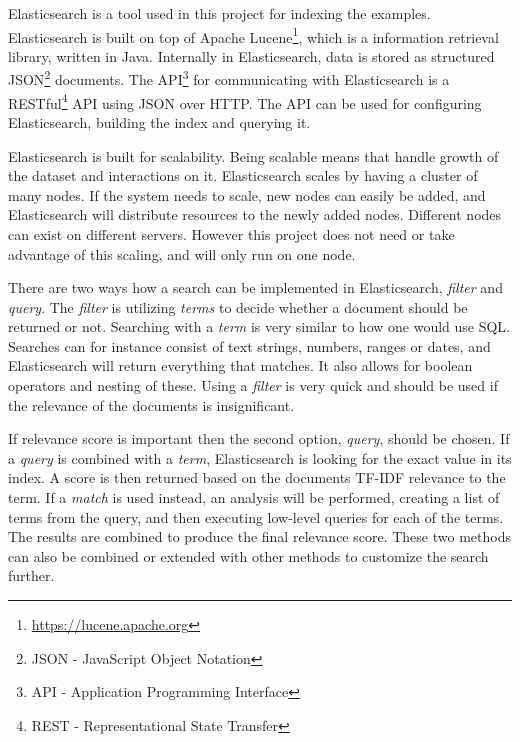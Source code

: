Elasticsearch is a tool used in this project for indexing the examples. Elasticsearch is built on top of Apache Lucene\footnote{\url{https://lucene.apache.org}}, which is a information retrieval library, written in Java. Internally in Elasticsearch, data is stored as structured JSON\footnote{JSON - JavaScript Object Notation} documents. The API\footnote{API - Application Programming Interface} for communicating with Elasticsearch is a RESTful\footnote{REST - Representational State Transfer} API using JSON over HTTP. The API can be used for configuring Elasticsearch, building the index and querying it. 

Elasticsearch is built for scalability. Being scalable means that handle growth of the dataset and interactions on it. Elasticsearch scales by having a cluster of many nodes. If the system needs to scale, new nodes can easily be added, and Elasticsearch will distribute resources to the newly added nodes. Different nodes can exist on different servers. However this project does not need or take advantage of this scaling, and will only run on one node.

There are two ways how a search can be implemented in Elasticsearch, \textit{filter} and \textit{query}. The \textit{filter} is utilizing \textit{terms} to decide whether a document should be returned or not. Searching with a \textit{term} is very similar to how one would use SQL. 
Searches can for instance consist of text strings, numbers, ranges or dates, and Elasticsearch will return everything that matches. It also allows for boolean operators and nesting of these. Using a \textit{filter} is very quick and should be used if the relevance of the documents is insignificant.

If relevance score is important then the second option, \textit{query}, should be chosen. If a \textit{query} is combined with a \textit{term}, Elasticsearch is looking for the exact value in its index. A score is then returned based on the documents TF-IDF relevance to the term. If a \textit{match} is used instead, an analysis will be performed, creating a list of terms from the query, and then executing low-level queries for each of the terms. The results are combined to produce the final relevance score. These two methods can also be combined or extended with other methods to customize the search further.


